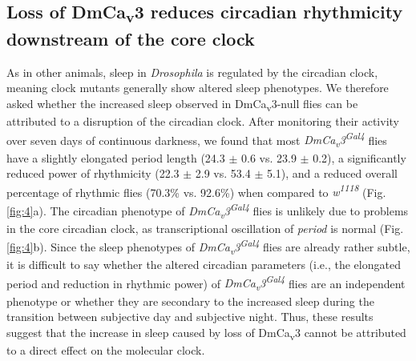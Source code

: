 \subsection*{Loss of DmCa\textsubscript{v}3 reduces circadian rhythmicity downstream of the core clock}

As in other animals, sleep in \emph{Drosophila} is regulated by the circadian clock, meaning clock mutants generally show altered sleep phenotypes\cite{hendricks:2003aa, parisky:2008aa}.
We therefore asked whether the increased sleep observed in DmCa\textsubscript{v}3-null flies can be attributed to a disruption of the circadian clock.
After monitoring their activity over seven days of continuous darkness, we found that most \emph{DmCa\textsubscript{v}3\textsuperscript{Gal4}} flies have a slightly elongated period length (24.3 $\pm$ 0.6 vs. 23.9 $\pm$ 0.2), a significantly reduced power of rhythmicity (22.3 $\pm$ 2.9 vs. 53.4 $\pm$ 5.1), and a reduced overall percentage of rhythmic flies (70.3\% vs. 92.6\%) when compared to \emph{w\textsuperscript{1118}} (Fig. \ref{fig:4}a).
The circadian phenotype of \emph{DmCa\textsubscript{v}3\textsuperscript{Gal4}} flies is unlikely due to problems in the core circadian clock, as transcriptional oscillation of \emph{period} is normal (Fig. \ref{fig:4}b).
Since the sleep phenotypes of \emph{DmCa\textsubscript{v}3\textsuperscript{Gal4}} flies are already rather subtle, it is difficult to say whether the altered circadian parameters (i.e., the elongated period and reduction in rhythmic power) of \emph{DmCa\textsubscript{v}3\textsuperscript{Gal4}} flies are an independent phenotype or whether they are secondary to the increased sleep during the transition between subjective day and subjective night.
Thus, these results suggest that the increase in sleep caused by loss of DmCa\textsubscript{v}3 cannot be attributed to a direct effect on the molecular clock.
